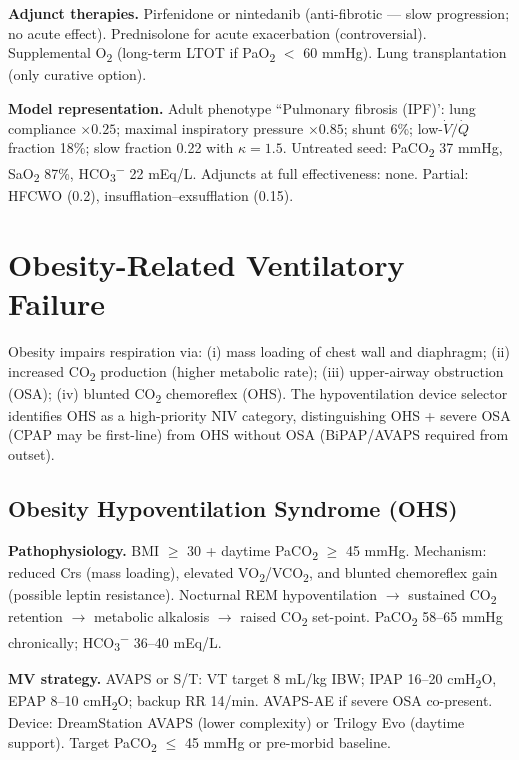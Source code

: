 \textbf{Adjunct therapies.} Pirfenidone or nintedanib (anti-fibrotic --- slow progression; no acute effect). Prednisolone for acute exacerbation (controversial). Supplemental O\textsubscript{2} (long-term LTOT if PaO\textsubscript{2} $<$ 60 mmHg). Lung transplantation (only curative option).

\textbf{Model representation.} Adult phenotype ``Pulmonary fibrosis (IPF)': lung compliance $\times0.25$; maximal inspiratory pressure $\times0.85$; shunt 6\%; low-$\dot V/\dot Q$ fraction 18\%; slow fraction 0.22 with $\kappa=1.5$. Untreated seed: PaCO\textsubscript{2} 37 mmHg, SaO\textsubscript{2} 87\%, HCO\textsubscript{3}\textsuperscript{$-$} 22 mEq/L. Adjuncts at full effectiveness: none. Partial: HFCWO (0.2), insufflation--exsufflation (0.15).

\section{Obesity-Related Ventilatory Failure}
Obesity impairs respiration via: (i) mass loading of chest wall and diaphragm; (ii) increased CO\textsubscript{2} production (higher metabolic rate); (iii) upper-airway obstruction (OSA); (iv) blunted CO\textsubscript{2} chemoreflex (OHS). The hypoventilation device selector identifies OHS as a high-priority NIV category, distinguishing OHS + severe OSA (CPAP may be first-line) from OHS without OSA (BiPAP/AVAPS required from outset).

\subsection{Obesity Hypoventilation Syndrome (OHS)}
\textbf{Pathophysiology.} BMI $\geq$ 30 + daytime PaCO\textsubscript{2} $\geq$ 45 mmHg. Mechanism: reduced Crs (mass loading), elevated VO\textsubscript{2}/VCO\textsubscript{2}, and blunted chemoreflex gain (possible leptin resistance). Nocturnal REM hypoventilation $\to$ sustained CO\textsubscript{2} retention $\to$ metabolic alkalosis $\to$ raised CO\textsubscript{2} set-point. PaCO\textsubscript{2} 58--65 mmHg chronically; HCO\textsubscript{3}\textsuperscript{$-$} 36--40 mEq/L.

\textbf{MV strategy.} AVAPS or S/T: VT target 8 mL/kg IBW; IPAP 16--20 cmH\textsubscript{2}O, EPAP 8--10 cmH\textsubscript{2}O; backup RR 14/min. AVAPS-AE if severe OSA co-present. Device: DreamStation AVAPS (lower complexity) or Trilogy Evo (daytime support). Target PaCO\textsubscript{2} $\leq$ 45 mmHg or pre-morbid baseline.

